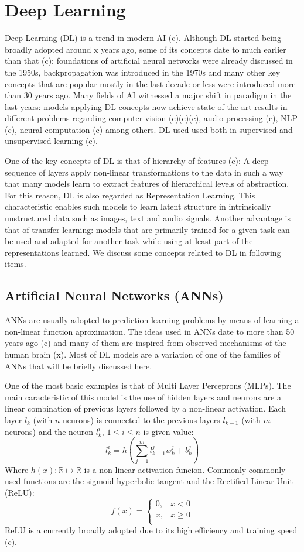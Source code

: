 \documentclass[English]{style/ic-tese-v3}
\begin{document}
\section{Deep Learning}
Deep Learning (DL) is a trend in modern AI (c).
Although DL started being broadly adopted around x years ago,
some of its concepts date to much earlier than that (c):
foundations of artificial neural networks were already discussed
in the 1950s, backpropagation was introduced in the 1970s
and many other key concepts that are popular mostly in the last decade or less
were introduced more than 30 years ago.
Many fields of AI witnessed a major shift in paradigm
in the last years: models applying DL concepts now achieve state-of-the-art
results in different problems regarding computer vision (c)(c)(c),
audio processing (c), NLP (c), neural computation (c) among others.
DL used used both in supervised and unsupervised learning (c).

One of the key concepts of DL is that of hierarchy of features (c):
A deep sequence of layers apply non-linear transformations to the data
in such a way that many models learn to extract features of hierarchical
levels of abstraction.
For this reason, DL is also regarded as Representation Learning.
This characteristic enables such models to learn latent structure
in intrinsically unstructured data such as images, text and audio signals.
Another advantage is that of transfer learning: models that are
primarily trained for a given task can be used and adapted for another
task while using at least part of the representations learned.
We discuss some concepts related to DL in following items.

\subsection{Artificial Neural Networks (ANNs)}
ANNs are usually adopted to prediction
learning problems by means of learning a non-linear function aproximation.
The ideas used in ANNs date to more than 50 years ago (c) and many of them
are inspired from observed mechanisms of the human brain (x).
Most of DL models are a variation of one of the families of ANNs
that will be briefly discussed here.

One of the most basic examples is that of Multi Layer Perceprons (MLPs).
The main caracteristic of this model is the use of hidden layers
and neurons are a linear combination of previous layers followed by
a non-linear activation.
Each layer $l_k$ (with $n$ neurons) is connected to the previous layers
$l_{k-1}$ (with $m$ neurons) and the neuron $l_k^i$, $1 \le i \le n$
is given value:
$$l_k^i = h\left(\sum_{j=1}^{m} l_{k-1}^jw_k^j + b_k^j\right)$$
Where $h(x): \mathbb{R} \mapsto \mathbb{R}$ is a non-linear activation funcion.
Commonly commonly used functions are the sigmoid hyperbolic tangent
and the Rectified Linear Unit (ReLU):
$$f(x) = \begin{cases}
    0, & x < 0 \\
    x, & x \ge 0 \\
        \end{cases}
$$
ReLU is a currently broadly adopted due to its high efficiency
and training speed (c).
\end{document}
